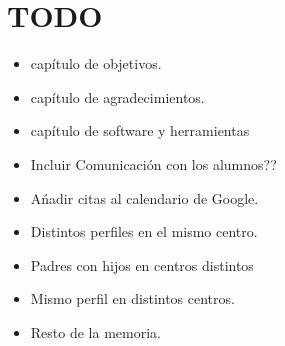 %
%
%
%

\cleardoublepage
\chapter{TODO}
\label{chap:TODO}

\begin{itemize}
	\item cap\'itulo de objetivos.
	\item cap\'itulo de agradecimientos.
	\item cap\'itulo de software y herramientas
	\item Incluir Comunicaci\'on con los alumnos??
	\item A\'nadir citas al calendario de Google.
	\item Distintos perfiles en el mismo centro.
	\item Padres con hijos en centros distintos
	\item Mismo perfil en distintos centros.
	\item Resto de la memoria.
\end{itemize}
